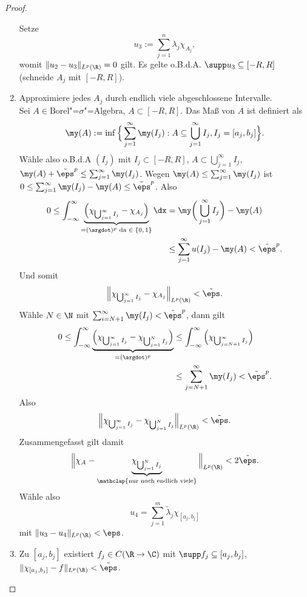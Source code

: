 \begin{st}
\begin{proof}
\begin{enumerate}[1)]
				Setze 
				\[
					u_3 := \sum_{j=1}^n \lambda_j \chi_{A_j},
				\]
				womit $\|u_2 - u_3\|_{L^p(\R)} = 0$ gilt.
				Es gelte o.B.d.A. $\supp u_3 \subset [-R,R]$ (schneide $A_j$ mit $[-R,R]$).
			\item
				Approximiere jedes $A_j$ durch endlich viele abgeschlossene Intervalle. \\
				Sei $A \in \text{Borel"=$\sigma$"=Algebra}$, $A \subset [-R,R]$.
				Das Maß von $A$ ist definiert als
				\[
					\my(A) := \inf \Big\{ \sum_{j=1}^\infty \my(I_j) : A \subset \bigcup_{j=1}^\infty I_j, I_j = [a_j, b_j] \Big\}.
				\]
				Wähle also o.B.d.A $(I_j)$ mit $I_j \subset [-R,R]$, $A \subset \bigcup_{j=1}^\infty I_j$, $\my(A) + \tilde \eps^p \le \sum_{j=1}^\infty \my(I_j)$.
				Wegen $\my(A) \le \sum_{j=1}^\infty \my(I_j)$ ist $0 \le \sum_{j=1}^\infty \my(I_j) - \my(A) \le \tilde \eps^p$.
				Also
				\begin{align*}
					0 
					\le \int_{-\infty}^\infty \underbrace{\Big(\chi_{\bigcup_{j=1}^\infty I_j} - \chi_{A_j}\Big)}_{=(\argdot)^p \text{ da $\in \{0,1\}$}} \dx
					&= \my\bigg(\bigcup_{j=1}^\infty I_j \bigg) - \my(A) \\
					&\le \sum_{j=1}^\infty u(I_j) - \my(A)
					< \tilde \eps^p.
				\end{align*}
				Und somit
				\[
					\Big\|\chi_{\bigcup_{j=1}^\infty I_j} - \chi_{A_j}\Big\|_{L^p(\R)} < \tilde \eps.
				\]
				Wähle $N \in \N$ mit $\sum_{i=N+1}^\infty \my(I_j) < \tilde \eps^p$, dann gilt
				\begin{align*}
					0 
					\le \int_{-\infty}^\infty \underbrace{\Big(\chi_{\bigcup_{j=1}^\infty I_j} - \chi_{\bigcup_{j=1}^N I_j}\Big)}_{=(\argdot)^p}
					&\le \int_{-\infty}^\infty \Big(\chi_{\bigcup_{j=N+1}^\infty I_j}\Big) \\
					&\le \sum_{j=N+1}^\infty \my(I_j) 
					< \tilde \eps^p.
				\end{align*}
				Also
				\[
					\Big\| \chi_{\bigcup_{j=1}^\infty I_j} - \chi_{\bigcup_{j=1}^N I_j} \Big\|_{L^p(\R)} < \tilde \eps.
				\]
				Zusammengefasst gilt damit
				\[
					\Big\| \chi_A - \underbrace{\chi_{\bigcup_{j=1}^N I_j}}_{\mathclap{\text{nur noch endlich viele}}} \Big\|_{L^p(\R)} < 2 \tilde \eps.
				\]
				Wähle also
				\[
					u_4 = \sum_{j=1}^m  \tilde \lambda_j \chi_{[a_j,b_j]}
				\]
				mit $\|u_3 - u_4\|_{L^p(\R)} < \eps$.
			\item
				Zu $[a_j,b_j]$ existiert $f_j \in C(\R \to \C)$ mit $\supp f_j \subset [a_j, b_j]$, $\|\chi_{[a_j,b_j]} - f\|_{L^p(\R)} < \tilde \eps$.


\end{enumerate}
\end{proof}
\end{st}
